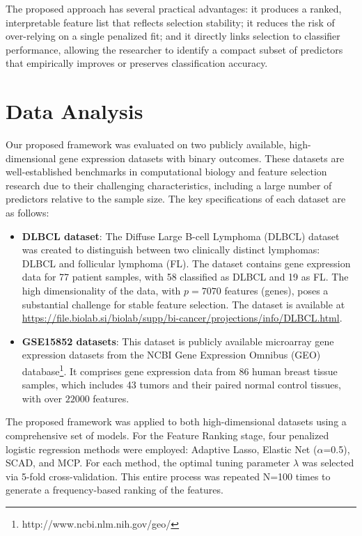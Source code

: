 \documentclass[twoside]{article}
\begin{document}
The proposed approach has several practical advantages: it produces a ranked, interpretable feature list that reflects selection stability; it reduces the risk of over-relying on a single penalized fit; and it directly links selection to classifier performance, allowing the researcher to identify a compact subset of predictors that empirically improves or preserves classification accuracy.\\

\vspace*{2cm}




\section{Data Analysis}\label{Sec4}
\setlength{\parskip}{-2pt}
Our proposed framework was evaluated on two publicly available, high-dimensional gene expression datasets with binary outcomes. These datasets are well-established benchmarks in computational biology and feature selection research due to their challenging characteristics, including a large number of predictors relative to the sample size. The key specifications of each dataset are as follows:
\begin{itemize}
	\item \textbf{DLBCL dataset}:
	The Diffuse Large B-cell Lymphoma (DLBCL) dataset was created to distinguish between two clinically distinct lymphomas: DLBCL and follicular lymphoma (FL). The dataset contains gene expression data for 77 patient samples, with 58 classified as DLBCL and 19 as FL. The high dimensionality of the data, with $ p = 7070 $ features (genes), poses a substantial challenge for stable feature selection. The dataset is available at \url{https://file.biolab.si/biolab/supp/bi-cancer/projections/info/DLBCL.html}.
	
	\item \textbf{GSE15852 datasets}:
	This dataset is publicly available microarray gene expression datasets from the NCBI Gene Expression Omnibus (GEO) database\footnote{http://www.ncbi.nlm.nih.gov/geo/}. It comprises gene expression data from 86 human breast tissue samples, which includes 43 tumors and their paired normal control tissues, with over $ 22000 $ features. 
\end{itemize}


The proposed framework was applied to both high-dimensional datasets using a comprehensive set of models. For the Feature Ranking stage, four penalized logistic regression methods were employed: Adaptive Lasso, Elastic Net ($\alpha$=0.5), SCAD, and MCP. For each method, the optimal tuning parameter $\lambda$ was selected via 5-fold cross-validation. This entire process was repeated N=100 times to generate a frequency-based ranking of the features.
\end{document}
